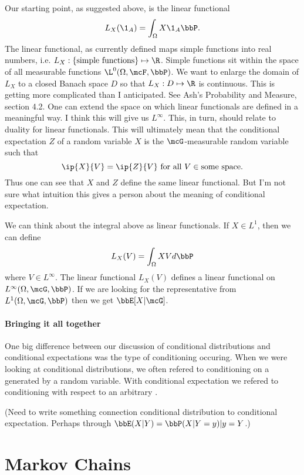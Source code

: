 \documentclass{report}
\begin{document}
Our starting point, as suggested above, is the linear functional
\[
L_X(\1_A) = \int_\Omega X \1_A \bbP.
\]
The linear functional, as currently defined maps simple functions into real numbers, i.e. $L_X : \{\textmd{simple functions}\} \mapsto \R$.  Simple functions sit within the space of all measurable functions $\L^0(\Omega, \mcF, \bbP)$.  We want to enlarge the domain of $L_X$ to a closed Banach space $D$ so that $L_X : D \mapsto \R$ is continuous.  
This is getting more complicated than I anticipated.  See Ash's Probability and Measure, section 4.2.  One can extend the space on which linear functionals are defined in a meaningful way.  I think this will give us $L^\infty$.  This, in turn, should relate to duality for linear functionals.  This will ultimately mean that the conditional expectation $Z$ of a random variable $X$ is the $\mcG$-measurable random variable such that
\[
\ip{X}{V} = \ip{Z}{V} \textmd{ for all } V \in \textmd{some space}.
\]
Thus one can see that $X$ and $Z$ define the same linear functional.  But I'm not sure what intuition this gives a person about the meaning of conditional expectation.

We can think about the integral above as linear functionals.  If $X \in L^1$, then we can define
\[
L_X(V) = \int_\Omega X V d \bbP
\]
where $V \in L^\infty$.  The linear functional $L_X(V)$ defines a linear functional on $L^\infty(\Omega, \mcG, \bbP)$.  If we are looking for the representative from $L^1(\Omega, \mcG, \bbP)$ then we get $\bbE[X|\mcG]$.


\subsubsection{Bringing it all together}

One big difference between our discussion of conditional distributions and conditional expectations was the type of conditioning occuring.  When we were looking at conditional distributions, we often refered to conditioning on a \sigalg generated by a random variable.  With conditional expectation we refered to conditioning with respect to an arbitrary \sigalg.

(Need to write something connection conditional distribution to conditional expectation.  Perhaps through $\bbE(X|Y) = \bbP(X|Y=y)|y=Y$.)

\chapter{Markov Chains}
\end{document}
